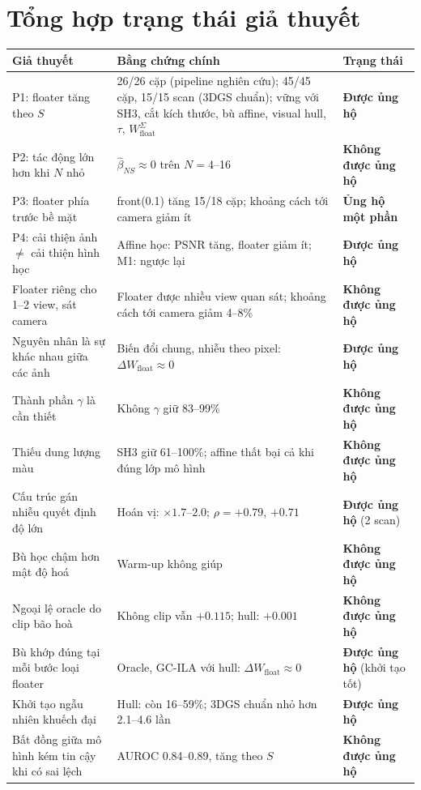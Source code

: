 \documentclass[11pt,a4paper]{article}
\newcommand{\W}{W_{\text{float}}}
\newcommand{\dW}{\Delta W_{\text{float}}}
\newcommand{\ok}{\textcolor{okc}{\textbf{Được ủng hộ}}}
\newcommand{\no}{\textcolor{noc}{\textbf{Không được ủng hộ}}}
\newcommand{\partly}{\textcolor{partc}{\textbf{Ủng hộ một phần}}}
\begin{document}
\section{Tổng hợp trạng thái giả thuyết}
\label{sec:status}
\begin{table}[H]
\centering\small
\begin{tabularx}{\textwidth}{@{}p{4.6cm} Y p{2.9cm}@{}}
\toprule
Giả thuyết & Bằng chứng chính & Trạng thái \\
\midrule
P1: floater tăng theo $S$ & 26/26 cặp (pipeline nghiên cứu); 45/45 cặp, 15/15 scan (3DGS chuẩn); vững với SH3, cắt kích thước, bù affine, visual hull, $\tau$, $\W^\Sigma$ & \ok \\
P2: tác động lớn hơn khi $N$ nhỏ & $\hat\beta_{NS}\approx0$ trên $N=4$--16 & \no \\
P3: floater phía trước bề mặt & front(0.1) tăng 15/18 cặp; khoảng cách tới camera giảm ít & \partly \\
P4: cải thiện ảnh $\neq$ cải thiện hình học & Affine học: PSNR tăng, floater giảm ít; M1: ngược lại & \ok \\
Floater riêng cho 1--2 view, sát camera & Floater được nhiều view quan sát; khoảng cách tới camera giảm 4--8\% & \no \\
Nguyên nhân là sự khác nhau giữa các ảnh & Biến đổi chung, nhiễu theo pixel: $\dW\approx0$ & \ok \\
Thành phần $\gamma$ là cần thiết & Không $\gamma$ giữ 83--99\% & \no \\
Thiếu dung lượng màu & SH3 giữ 61--100\%; affine thất bại cả khi đúng lớp mô hình & \no \\
Cấu trúc gán nhiễu quyết định độ lớn & Hoán vị: $\times1.7$--$2.0$; $\rho=+0.79$, $+0.71$ & \ok{} (2 scan) \\
Bù học chậm hơn mật độ hoá & Warm-up không giúp & \no \\
Ngoại lệ oracle do clip bão hoà & Không clip vẫn $+0.115$; hull: $+0.001$ & \no \\
Bù khớp đúng tại mỗi bước loại floater & Oracle, GC-ILA với hull: $\dW\approx0$ & \ok{} (khởi tạo tốt) \\
Khởi tạo ngẫu nhiên khuếch đại & Hull: còn 16--59\%; 3DGS chuẩn nhỏ hơn 2.1--4.6 lần & \ok \\
Bất đồng giữa mô hình kém tin cậy khi có sai lệch & AUROC 0.84--0.89, tăng theo $S$ & \no \\
\bottomrule
\end{tabularx}
\end{table}
\end{document}
